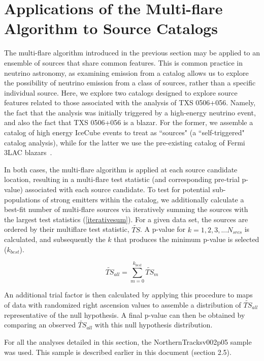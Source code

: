 \chapter{Applications of the Multi-flare Algorithm to Source Catalogs}\label{chapter:catalogsearches}
The multi-flare algorithm introduced in the previous section may be applied to an ensemble of sources that share common features. This is common practice in neutrino astronomy, as examining emission from a catalog allows us to explore the possibility of neutrino emission from a class of sources, rather than a specific individual source. 
Here, we explore two catalogs designed to explore source features related to those associated with the analysis of TXS 0506+056. Namely, the fact that the analysis was initially triggered by a high-energy neutrino event, and also the fact that TXS 0506+056 is a blazar. For the former, we assemble a catalog of high energy IceCube events to treat as ``sources" (a ``self-triggered" catalog analysis), while for the latter we use the pre-existing catalog of Fermi 3LAC blazars~\cite{fermi_3lac}.

In both cases, the multi-flare algorithm is applied at each source candidate location, resulting in a multi-flare test statistic (and corresponding pre-trial p-value) associated with each source candidate.
To test for potential sub-populations of strong emitters within the catalog, we additionally calculate a best-fit number of multi-flare sources via iteratively summing the sources with the largest test statistics (\ref{iterativesum}). For a given data set, the sources are ordered by their multiflare test statistic, $\widetilde{TS}$. A p-value for $k=1,2,3,...N_{srcs}$ is calculated, and subsequently the $k$ that produces the minimum p-value is selected ($k_{best}$).

\begin{equation}
    \widetilde{TS}_{all} = \sum_{m=0}^{k_{best}}\widetilde{TS}_m
\label{iterativesum}
\end{equation}

An additional trial factor is then calculated by applying this procedure to maps of data with randomized right ascension values to assemble a distribution of $\widetilde{TS}_{all}$ representative of the null hypothesis. A final p-value can then be obtained by comparing an observed $\widetilde{TS}_{all}$ with this null hypothesis distribution. 

For all the analyses detailed in this section, the NorthernTracksv002p05 sample was used. This sample is described earlier in this document (section 2.5). 

